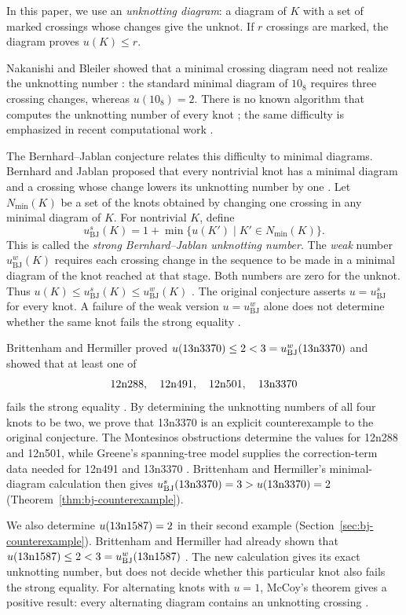 \documentclass[12pt, oneside]{amsart}
\newcommand{\kn}[2]{\textup{#1#2}}
\begin{document}
In this paper, we use an \emph{unknotting diagram}: a diagram of $K$
with a set of marked crossings whose changes give the unknot. If $r$ crossings are
marked, the diagram proves $u(K)\le r$.

Nakanishi and Bleiler showed that a minimal crossing diagram need not realize the unknotting number
\cite{Nakanishi,Bleiler}: the standard minimal diagram of $10_8$ requires three crossing
changes, whereas $u(10_8)=2$. There is no known
algorithm that computes the unknotting number of every knot
\cite{LackenbySurvey}; the same difficulty is emphasized in recent computational work
\cite{Applebaum}.

The Bernhard--Jablan conjecture relates this difficulty to minimal diagrams. Bernhard and Jablan
proposed that every nontrivial knot has a minimal diagram and a crossing whose
change lowers its unknotting number by one \cite{Bernhard,Jablan}. Let
$N_{\min}(K)$ be a set of the knots obtained by changing one crossing in any minimal
diagram of $K$. For nontrivial $K$, define
\[
    u^s_{\mathrm{BJ}}(K)=1+\min\{u(K')\mid K'\in N_{\min}(K)\}.
\]
This is called the \emph{strong Bernhard--Jablan unknotting number}. The \emph{weak}
number $u^w_{\mathrm{BJ}}(K)$ requires each crossing change in the sequence to
be made in a minimal diagram of the knot reached at that stage. Both numbers
are zero for the unknot. Thus
$u(K)\le u^s_{\mathrm{BJ}}(K)\le u^w_{\mathrm{BJ}}(K)$
\cite[\S1 and Lem.~2.1]{BH1705}. The original conjecture asserts
$u=u^s_{\mathrm{BJ}}$ for every knot. 
A failure of the weak version $u=u^w_{\mathrm{BJ}}$ alone does not determine whether the same knot fails the strong equality
\cite[Cor.~2.2]{BH1705}.

Brittenham and Hermiller proved
$u(\kn{13n}{3370})\le2<3=u^w_{\mathrm{BJ}}(\kn{13n}{3370})$ and showed
that at least one of
\[
    \kn{12n}{288},\quad \kn{12n}{491},\quad \kn{12n}{501},\quad \kn{13n}{3370}
\]
fails the strong equality \cite[Thm.~1.3]{BH1705}. By determining the
unknotting numbers of all four knots to be two, we prove that
\kn{13n}{3370} is an explicit counterexample to the original conjecture.
The Montesinos obstructions determine the values for \kn{12n}{288} and
\kn{12n}{501}, while Greene's spanning-tree model supplies the correction-term
data needed for \kn{12n}{491} and \kn{13n}{3370} \cite{Greene}.
Brittenham and Hermiller's minimal-diagram calculation then gives
$u^s_{\mathrm{BJ}}(\kn{13n}{3370})=3>u(\kn{13n}{3370})=2$
(Theorem~\ref{thm:bj-counterexample}).

We also determine $u(\kn{13n}{1587})=2$ in their second example
(Section~\ref{sec:bj-counterexample}). Brittenham and Hermiller had already shown that
$u(\kn{13n}{1587})\le2<3=u^w_{\mathrm{BJ}}(\kn{13n}{1587})$
\cite[\S3]{BH1705}. The new calculation gives its exact unknotting number, but does not decide
whether this particular knot also fails the strong equality.
For alternating knots with $u=1$, McCoy's theorem gives a positive result:
every alternating diagram contains an unknotting crossing \cite{McCoy}.
\end{document}
